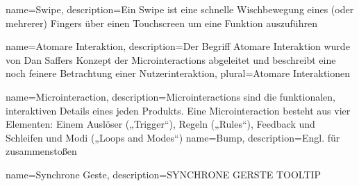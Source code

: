 {
    name=Swipe,
    description={Ein Swipe ist eine schnelle Wischbewegung eines (oder 				mehrerer) Fingers über einen Touchscreen um eine Funktion auszuführen}
}

{
    name=Atomare Interaktion,
    description={Der Begriff Atomare Interaktion wurde von Dan Saffers Konzept 		der Microinteractions abgeleitet und beschreibt eine noch feinere 				Betrachtung einer Nutzerinteraktion},
    plural={Atomare Interaktionen}
}

{
    name=Microinteraction,
    description={Microinteractions sind die funktionalen, interaktiven Details 		eines jeden Produkts. Eine Microinteraction besteht aus vier Elementen: 		Einem Auslöser („Trigger“), Regeln („Rules“), Feedback und Schleifen und 		Modi („Loops and Modes“)}
}
{
	name=Bump,
	description={Engl. für zusammenstoßen}
}

{
	name=Synchrone Geste,
	description={SYNCHRONE GERSTE TOOLTIP}
}
